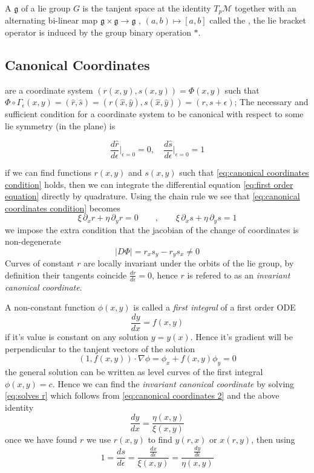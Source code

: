 \documentclass[12pt]{article}
\begin{document}
A  $\mathfrak g$ of a lie group $G$ is the tanjent space at the identity $T_p\mathcal M$ together with an alternating bi-linear map $\mathfrak g\times \mathfrak g \to \mathfrak g$ , $(a,b)\mapsto [a,b]$ called the , the lie bracket operator is induced by the group binary operation $\ast$. 

 
\subsection{Canonical Coordinates}
 are a coordinate system $(r(x,y),s(x,y)) =\Phi (x,y)$ such that $\Phi\circ \Gamma_\epsilon (x,y) = (\hat r, \hat s) = (r(\hat x,\hat y),s(\hat x,\hat y)) = (r,s+\epsilon)$; The necessary and sufficient condition for a coordinate system to be canonical with respect to some lie symmetry (in the plane) is 

\begin{equation}\label{eq:canonical coordinates condition}
    \frac{d\hat r}{d\epsilon}\bigg|_{\epsilon=0}=0,\quad \frac{d\hat s}{d\epsilon}\bigg|_{\epsilon=0}=1
\end{equation}

if we can find functions $r(x,y)$ and $s(x,y)$ such that \eqref{eq:canonical coordinates condition} holds, then we can integrate the differential equation \eqref{eq:first order equation} directly by quadrature. Using the chain rule we see that \eqref{eq:canonical coordinates condition} becomes
\begin{equation}\label{eq:canonical coordinates 2}
    \xi\,\partial_xr + \eta\,\partial_yr = 0\qquad,\qquad \xi\,\partial_xs + \eta\,\partial_ys = 1
\end{equation}
we impose the extra condition that the jacobian of the change of coordinates is non-degenerate
$$
\left|D\Phi \right| = r_xs_y - r_ys_x \neq 0
$$
Curves of constant $r$ are locally invariant under the orbits of the lie group, by definition their tangents coincide $\frac{dr}{d\epsilon}=0$, hence $r$ is refered to as an \textit{invariant canonical coordinate}. 

A non-constant function $\phi(x,y)$ is called a \textit{first integral} of a first order ODE 
$$\frac{dy}{dx} = f(x,y)$$
if it's value is constant on any solution $y=y(x)$. Hence it's gradient will be perpendicular to the tanjent vectors of the solution
$$(1,f(x,y)) \cdot \nabla \phi = \phi_x + f(x,y)\phi_y = 0$$
the general solution can be written as level curves of the first integral $\phi(x,y)=c$. Hence we can find the \textit{invariant canonical coordinate} by solving \eqref{eq:solves r} which follows from \eqref{eq:canonical coordinates 2} and the above identity
\begin{equation}\label{eq:solves r}
    \frac{dy}{dx} = \frac{\eta(x,y)}{\xi(x,y)}
\end{equation}
once we have found $r$ we use $r(x,y)$ to find $y(r,x)$ or $x(r,y)$, then using 
$$1 = \frac{ds}{d\epsilon} = \frac{\frac{dx}{d\epsilon}}{\xi(x,y)} = \frac{\frac{dy}{d\epsilon}}{\eta(x,y)}$$
\end{document}
